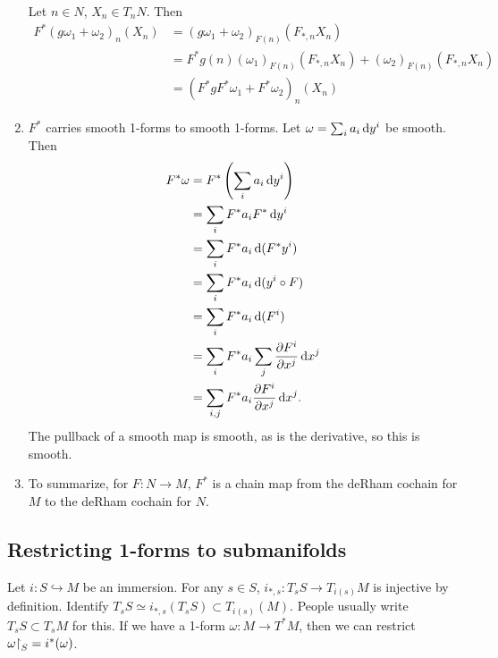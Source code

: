 \begin{enumerate}
{    Let $n \in N$, $X_n \in T_n N$. Then
    \begin{align*}
       F^\ast(g \omega_1 + \omega_2)_n(X_n)
    &= (g \omega_1 + \omega_2)_{F(n)}(F_{\ast, n}X_n) \\
    &= F^\ast g(n)(\omega_1)_{F(n)}(F_{\ast,n}X_n)
     + (\omega_2)_{F(n)}(F_{\ast,n}X_n) \\
    &= (F^\ast g F^\ast \omega_1 + F^\ast \omega_2)_n(X_n)
    \end{align*}
  }
  \item{
    $F^\ast$ carries smooth 1-forms to smooth 1-forms.
    Let $\omega = \sum_i a_i \mathop{}\!\mathrm{d} y^i$ be smooth. Then
    \begin{align*}
       F^\ast \omega
    &= F^\ast
       \left(
         \sum_i a_i \mathop{}\!\mathrm{d} y^i
       \right) \\
    &= \sum_i
         F^\ast a_i
         F^\ast \mathop{}\!\mathrm{d} y^i \\
    &= \sum_i
         F^\ast a_i
         \mathop{}\!\mathrm{d}(F^\ast y^i) \\
    &= \sum_i
         F^\ast a_i
         \mathop{}\!\mathrm{d} (y^i \circ F) \\
    &= \sum_i
         F^\ast a_i
         \mathop{}\!\mathrm{d}(F^i) \\
    &= \sum_i
         F^\ast a_i
         \sum_j
           \frac{\partial F^i}{\partial x^j}
           \mathop{}\!\mathrm{d} x^j \\
    &= \sum_{i,j}
         F^\ast a_i
         \frac{\partial F^i}{\partial x^j}
         \mathop{}\!\mathrm{d} x^j.
    \end{align*}
    The pullback of a smooth map is smooth, as is the derivative, so
    this is smooth.
  }
  \item{
    To summarize, for $F: N \to M$,
    $F^\ast$ is a chain map from the deRham cochain for $M$ to the
    deRham cochain for $N$.
  }
\end{enumerate}

\subsection{Restricting 1-forms to submanifolds}
Let $i : S \hookrightarrow M$ be an immersion.
For any $s \in S$,
$i_{\ast, s} : T_s S \to T_{i(s)} M$ is injective by definition.
Identify
$T_s S \simeq i_{\ast, s}(T_s S) \subset T_{i(s)}(M)$. People usually
write $T_s S \subset T_s M$ for this. If we have a 1-form
$\omega : M \to T^\ast M$, then we can restrict
$\omega\mathord{\upharpoonright}_S = i^\ast(\omega)$.

